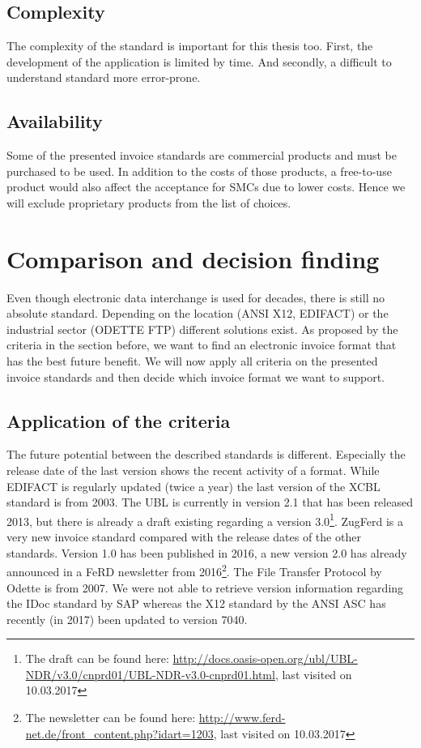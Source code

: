 \subsection{Complexity}
\label{sec2.2.5}
The complexity of the standard is important for this thesis too. First, the development of the application is limited by time. And secondly, a difficult to understand standard more error-prone.

\subsection{Availability}
\label{sec2.2.6}

Some of the presented invoice standards are commercial products and must be purchased to be used. In addition to the costs of those products, a free-to-use product would also affect the acceptance for SMCs due to lower costs. Hence we will exclude proprietary products from the list of choices. 

\section{Comparison and decision finding}
\label{sec2.3}

Even though electronic data interchange is used for decades, there is still no absolute standard. Depending on the location (ANSI X12, EDIFACT) or the industrial sector (ODETTE FTP) different solutions exist. As proposed by the criteria in the section before, we want to find an electronic invoice format that has the best future benefit. We will now apply all criteria on the presented invoice standards and then decide which invoice format we want to support.

\subsection{Application of the criteria}
\label{sec2.3.1}

The future potential between the described standards is different. Especially the release date of the last version shows the recent activity of a format. While EDIFACT is regularly updated (twice a year) the last version of the XCBL standard is from 2003. The UBL is currently in version 2.1 that has been released 2013, but there is already a draft existing regarding a version 3.0\footnote{The draft can be found here: \url{http://docs.oasis-open.org/ubl/UBL-NDR/v3.0/cnprd01/UBL-NDR-v3.0-cnprd01.html}, last visited on 10.03.2017}. ZugFerd is a very new invoice standard compared with the release dates of the other standards. Version 1.0 has been published in 2016, a new version 2.0 has already announced in a FeRD newsletter from 2016\footnote{The newsletter can be found here: \url{http://www.ferd-net.de/front_content.php?idart=1203}, last visited on 10.03.2017}. The File Transfer Protocol by Odette is from 2007. We were not able to retrieve version information regarding the IDoc standard by SAP whereas the X12 standard by the ANSI ASC has recently (in 2017) been updated to version 7040.

